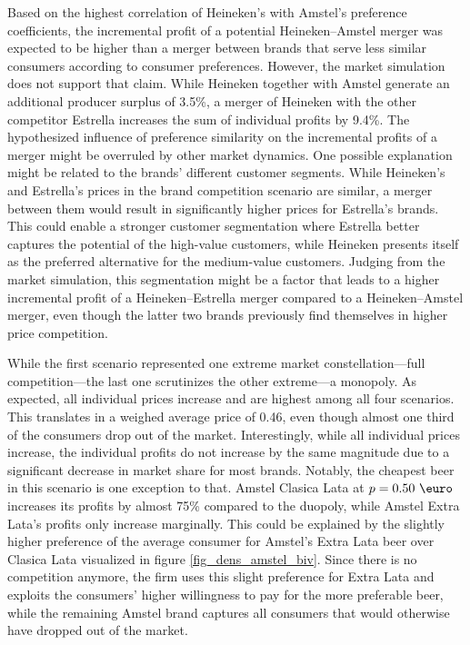 \documentclass[12pt,a4paper]{article}
\begin{document}
Based on the highest correlation of Heineken's with Amstel's preference coefficients, the incremental profit of a potential Heineken--Amstel merger was expected to be higher than a merger between brands that serve less similar consumers according to consumer preferences.
However, the market simulation does not support that claim.
While Heineken together with Amstel generate an additional producer surplus of 3.5\%, a merger of Heineken with the other competitor Estrella increases the sum of individual profits by 9.4\%.
The hypothesized influence of preference similarity on the incremental profits of a merger might be overruled by other market dynamics.
One possible explanation might be related to the brands' different customer segments.
While Heineken's and Estrella's prices in the brand competition scenario are similar, a merger between them would result in significantly higher prices for Estrella's brands.
This could enable a stronger customer segmentation where Estrella better captures the potential of the high-value customers, while Heineken presents itself as the preferred alternative for the medium-value customers.
Judging from the market simulation, this segmentation might be a factor that leads to a higher incremental profit of a Heineken--Estrella merger compared to a Heineken--Amstel merger, even though the latter two brands previously find themselves in higher price competition.

While the first scenario represented one extreme market constellation---full competition---the last one scrutinizes the other extreme---a monopoly.
As expected, all individual prices increase and are highest among all four scenarios.
This translates in a weighed average price of 0.46\text{ \euro }, even though almost one third of the consumers drop out of the market.
Interestingly, while all individual prices increase, the individual profits do not increase by the same magnitude due to a significant decrease in market share for most brands.
Notably, the cheapest beer in this scenario is one exception to that.
Amstel Clasica Lata at $p=0.50\text{ \euro}$ increases its profits by almost 75\% compared to the duopoly, while Amstel Extra Lata's profits only increase marginally.
This could be explained by the slightly higher preference of the average consumer for Amstel's Extra Lata beer over Clasica Lata visualized in figure \ref{fig_dens_amstel_biv}.
Since there is no competition anymore, the firm uses this slight preference for Extra Lata and exploits the consumers' higher willingness to pay for the more preferable beer, while the remaining Amstel brand captures all consumers that would otherwise have dropped out of the market.
\end{document}

